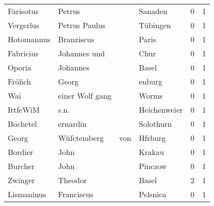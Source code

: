 \documentclass[10pt,a4paper,landscape]{article}
\begin{document}
\begin{longtable}{llllrr}
                Farisotus &                             Petrus &             &                                     Sanaden &          0 &         1 \\
                Vergerlus &                      Petrus Paulus &             &                                    Tübingen &          0 &         1 \\
               Hotomannus &                         Branziscus &             &                                       Paris &          0 &         1 \\
                Fabricius &                       Johannes und &             &                                        Chur &          0 &         1 \\
                   Oporia &                           Johannes &             &                                       Basel &          0 &         1 \\
                  Frölich &                              Georg &             &                                      euburg &          0 &         1 \\
                      Wai &                    einer Wolf gang &             &                                       Worms &          0 &         1 \\
                 IttfeWiM &                               s.n. &             &                                Heichenweier &          0 &         1 \\
                 Bochetel &                           ernardin &             &                                   Solothurn &          0 &         1 \\
                    Georg &                        Wüfctemberg &         von &                                     Hfrburg &          0 &         1 \\
                  Bordier &                               John &             &                                      Krakau &          0 &         1 \\
                  Burcher &                               John &             &                                     Pinczow &          0 &         1 \\
                  Zwinger &                            Theodor &             &                                       Basel &          2 &         1 \\
               Lismaninus &                         Franciscus &             &                                    Pelsnica &          0 &         1 \\

\end{longtable}
\end{document}

